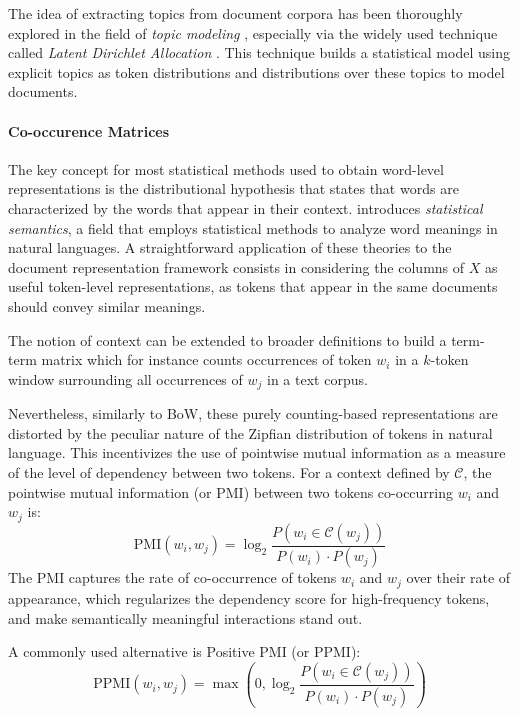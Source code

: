 The idea of extracting topics from document corpora has been thoroughly explored in the field of \textit{topic modeling} \citep{churchill2022evolution}, especially via the widely used technique called \textit{Latent Dirichlet Allocation} \citep{lda}. This technique builds a statistical model using explicit topics as token distributions and distributions over these topics to model documents.



\paragraph*{Co-occurence Matrices}

The key concept for most statistical methods used to obtain word-level representations is the distributional hypothesis \citep{harris1954distributional} that states that words are characterized by the words that appear in their context. \citep{weaver-1952-translation} introduces \textit{statistical semantics}, a field that employs statistical methods to analyze word meanings in natural languages. A straightforward application of these theories to the document representation framework consists in considering the columns of $X$ as useful token-level representations, as tokens that appear in the same documents should convey similar meanings.

The notion of context can be extended to broader definitions to build a term-term matrix which for instance counts occurrences of token $w_i$ in a $k$-token window surrounding all occurrences of $w_j$ in a text corpus. 

Nevertheless, similarly to BoW, these purely counting-based representations are distorted by the peculiar nature of the Zipfian distribution of tokens in natural language. This incentivizes the use of pointwise mutual information \citep{shannon_mi} as a measure of the level of dependency between two tokens. For a context defined by $\mathcal{C}$, the pointwise mutual information (or PMI) between two tokens co-occurring $w_i$ and $w_j$ is:
$$
\text{PMI}(w_i, w_j) = \log_2 \frac{P(w_i \in \mathcal{C}(w_j))}{P(w_i) \cdot P(w_j)}
$$
The PMI captures the rate of co-occurrence of tokens $w_i$ and $w_j$ over their rate of appearance, which regularizes the dependency score for high-frequency tokens, and make semantically meaningful interactions stand out.

A commonly used alternative is Positive PMI (or PPMI):
$$
\text{PPMI}(w_i, w_j) = \max (0, \log_2 \frac{P(w_i \in \mathcal{C}(w_j))}{P(w_i) \cdot P(w_j)})
$$


